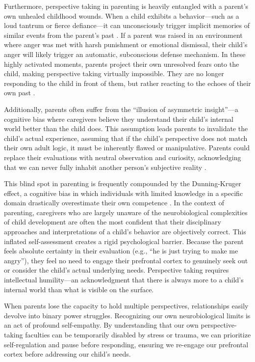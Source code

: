 Furthermore, perspective taking in parenting is heavily entangled with a parent's own unhealed childhood wounds. 
When a child exhibits a behavior---such as a loud tantrum or fierce defiance---it can unconsciously trigger implicit memories of similar events from the parent's past \citep{siegel2003}. 
If a parent was raised in an environment where anger was met with harsh punishment or emotional dismissal, their child's anger will likely trigger an automatic, subconscious defense mechanism. 
In these highly activated moments, parents project their own unresolved fears onto the child, making perspective taking virtually impossible. 
They are no longer responding to the child in front of them, but rather reacting to the echoes of their own past \citep{vanderkolk2014}.

Additionally, parents often suffer from the ``illusion of asymmetric insight''---a cognitive bias where caregivers believe they understand their child's internal world better than the child does. 
This assumption leads parents to invalidate the child's actual experience, assuming that if the child’s perspective does not match their own adult logic, it must be inherently flawed or manipulative. 
Parents could replace their evaluations with neutral observation and curiosity, acknowledging that we can never fully inhabit another person's subjective reality \citep{rosenberg2003}. 

This blind spot in parenting is frequently compounded by the Dunning-Kruger effect, a cognitive bias in which individuals with limited knowledge in a specific domain drastically overestimate their own competence \citep{kruger1999}. 
In the context of parenting, caregivers who are largely unaware of the neurobiological complexities of child development are often the most confident that their disciplinary approaches and interpretations of a child's behavior are objectively correct. 
This inflated self-assessment creates a rigid psychological barrier. 
Because the parent feels absolute certainty in their evaluation (e.g., ``he is just trying to make me angry''), they feel no need to engage their prefrontal cortex to genuinely seek out or consider the child's actual underlying needs. 
Perspective taking requires intellectual humility---an acknowledgment that there is always more to a child's internal world than what is visible on the surface.

When parents lose the capacity to hold multiple perspectives, relationships easily devolve into binary power struggles. 
Recognizing our own neurobiological limits is an act of profound self-empathy. 
By understanding that our own perspective-taking faculties can be temporarily disabled by stress or trauma, we can prioritize self-regulation and pause before responding, ensuring we re-engage our prefrontal cortex before addressing our child's needs.


